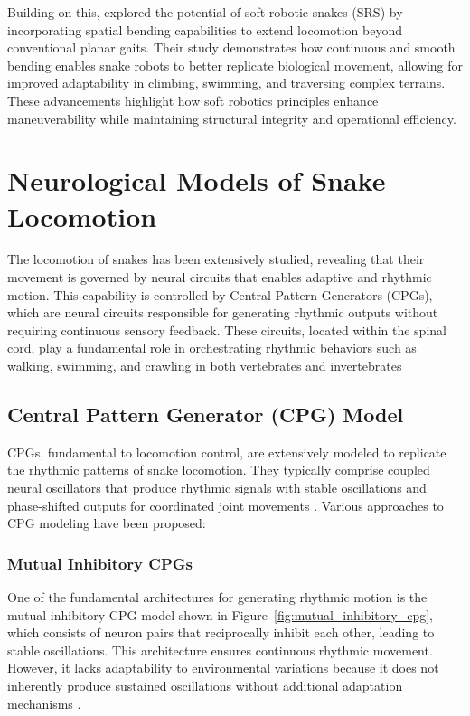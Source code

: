 \documentclass[12pt,a4paper]{report}
\begin{document}
Building on this, \textcite{Arachchige2021} explored the potential of soft robotic snakes (SRS) by incorporating spatial bending capabilities to extend locomotion beyond conventional planar gaits. Their study demonstrates how continuous and smooth bending enables snake robots to better replicate biological movement, allowing for improved adaptability in climbing, swimming, and traversing complex terrains. These advancements highlight how soft robotics principles enhance maneuverability while maintaining structural integrity and operational efficiency.

\section{Neurological Models of Snake Locomotion}
\label{sec:neurological_models}
The locomotion of snakes has been extensively studied, revealing that their movement is governed by neural circuits that enables adaptive and rhythmic motion. This capability is controlled by Central Pattern Generators (CPGs), which are neural circuits responsible for generating rhythmic outputs without requiring continuous sensory feedback. These circuits, located within the spinal cord, play a fundamental role in orchestrating rhythmic behaviors such as walking, swimming, and crawling in both vertebrates and invertebrates \cite{MARDER2001R986}

\subsection{Central Pattern Generator (CPG) Model}

CPGs, fundamental to locomotion control, are extensively modeled to replicate the rhythmic patterns of snake locomotion. They typically comprise coupled neural oscillators that produce rhythmic signals with stable oscillations and phase-shifted outputs for coordinated joint movements \cite{wang2020cpg}. Various approaches to CPG modeling have been proposed:

\FloatBarrier
\subsubsection{Mutual Inhibitory CPGs}

One of the fundamental architectures for generating rhythmic motion is the mutual inhibitory CPG model shown in Figure~\ref{fig:mutual_inhibitory_cpg}, which consists of neuron pairs that reciprocally inhibit each other, leading to stable oscillations. This architecture ensures continuous rhythmic movement. However, it lacks adaptability to environmental variations because it does not inherently produce sustained oscillations without additional adaptation mechanisms \cite{Lu2006}.
\end{document}
